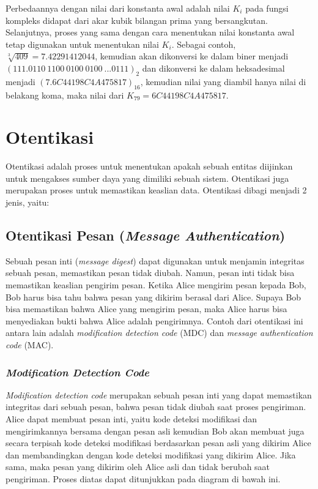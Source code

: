 Perbedaannya dengan nilai dari konstanta awal adalah nilai \begin{math}K_i\end{math} pada fungsi kompleks didapat dari akar kubik bilangan prima yang bersangkutan. Selanjutnya, proses yang sama dengan cara menentukan nilai konstanta awal tetap digunakan untuk menentukan nilai \begin{math}K_i\end{math}. Sebagai contoh, \begin{math}\sqrt[3]{409} = 7.42291412044\end{math}, kemudian akan dikonversi ke dalam biner menjadi \begin{math}(111.0110\: 1100\: 0100\: 0100\: ... 0111)_2\end{math} dan dikonversi ke dalam heksadesimal menjadi \begin{math}(7.6C44198C4A475817)_{16}\end{math}, kemudian nilai yang diambil hanya nilai di belakang koma, maka nilai dari \begin{math}K_{79} = 6C44198C4A475817\end{math}.

\section{Otentikasi}
Otentikasi adalah proses untuk menentukan apakah sebuah entitas diijinkan untuk mengakses sumber daya yang dimiliki sebuah sistem. Otentikasi juga merupakan proses untuk memastikan keaslian data. Otentikasi dibagi menjadi 2 jenis, yaitu:

\subsection{Otentikasi Pesan (\textit{Message Authentication})}
Sebuah pesan inti (\textit{message digest}) dapat digunakan untuk menjamin integritas sebuah pesan, memastikan pesan tidak diubah. Namun, pesan inti tidak bisa memastikan keaslian pengirim pesan. Ketika Alice mengirim pesan kepada Bob, Bob harus bisa tahu bahwa pesan yang dikirim berasal dari Alice. Supaya Bob bisa memastikan bahwa Alice yang mengirim pesan, maka Alice harus bisa menyediakan bukti bahwa Alice adalah pengirimnya. Contoh dari otentikasi ini antara lain adalah \textit{modification detection code} (MDC) dan \textit{message authentication code} (MAC).

\subsubsection{\textit{Modification Detection Code}}
\textit{Modification detection code} merupakan sebuah pesan inti yang dapat memastikan integritas dari sebuah pesan, bahwa pesan tidak diubah saat proses pengiriman. Alice dapat membuat pesan inti, yaitu kode deteksi modifikasi dan mengirimkannya bersama dengan pesan asli kemudian Bob akan membuat juga secara terpisah kode deteksi modifikasi berdasarkan pesan asli yang dikirim Alice dan membandingkan dengan kode deteksi modifikasi yang dikirim Alice. Jika sama, maka pesan yang dikirim oleh Alice asli dan tidak berubah saat pengiriman. Proses diatas dapat ditunjukkan pada diagram di bawah ini.

